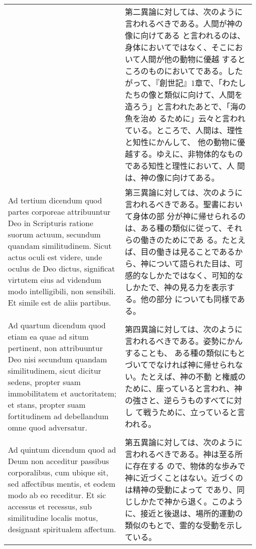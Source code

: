 \documentclass[10pt]{jsarticle}
\begin{document}
\begin{longtable}{p{21em}p{21em}}
&

第二異論に対しては、次のように言われるべきである。人間が神の像に向けてある
と言われるのは、身体においてではなく、そこにおいて人間が他の動物に優越
するところのものにおいてである。したがって、『創世記』1章で、「わたし
たちの像と類似に向けて、人間を造ろう」と言われたあとで、「海の魚を治め
るために」云々と言われている。ところで、人間は、理性と知性にかんして、
他の動物に優越する。ゆえに、非物体的なものである知性と理性において、人
間は、神の像に向けてある。

\\




Ad tertium dicendum quod partes corporeae attribuuntur Deo in
Scripturis ratione suorum actuum, secundum quandam
similitudinem. Sicut actus oculi est videre, unde oculus de Deo
dictus, significat virtutem eius ad videndum modo intelligibili, non
sensibili. Et simile est de aliis partibus.


&

第三異論に対しては、次のように言われるべきである。聖書において身体の部
分が神に帰せられるのは、ある種の類似に従って、それらの働きのためにであ
る。たとえば、目の働きは見ることであるから、神について語られた目は、可
感的なしかたではなく、可知的なしかたで、神の見る力を表示する。他の部分
についても同様である。


\\



Ad quartum dicendum quod etiam ea quae ad situm pertinent, non
attribuuntur Deo nisi secundum quandam similitudinem, sicut dicitur
sedens, propter suam immobilitatem et auctoritatem; et stans, propter
suam fortitudinem ad debellandum omne quod adversatur.


&

第四異論に対しては、次のように言われるべきである。姿勢にかんすることも、
ある種の類似にもとづいてでなければ神に帰せられない。たとえば、神の不動
と権威のために、座っていると言われ、神の強さと、逆らうものすべてに対し
て戦うために、立っていると言われる。

\\


Ad quintum dicendum quod ad Deum non acceditur passibus corporalibus,
cum ubique sit, sed affectibus mentis, et eodem modo ab eo
receditur. Et sic accessus et recessus, sub similitudine localis
motus, designant spiritualem affectum.


&

第五異論に対しては、次のように言われるべきである。神は至る所に存在する
ので、物体的な歩みで神に近づくことはない。近づくのは精神の受動によって
であり、同じしかたで神から退く。このように、接近と後退は、場所的運動の
類似のもとで、霊的な受動を示している。




\end{longtable}
\end{document}
